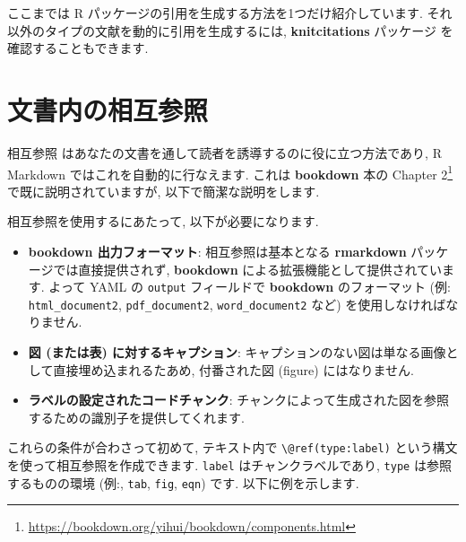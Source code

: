 \documentclass[
  11pt,
]{bxjsreport}
\renewcommand{\href}[2]{#2\footnote{\url{#1}}}
\begin{document}
ここまでは R パッケージの引用を生成する方法を1つだけ紹介しています. それ以外のタイプの文献を動的に引用を生成するには, \textbf{knitcitations} パッケージ \autocite{R-knitcitations} を確認することもできます.

\hypertarget{cross-ref}{%
\section{文書内の相互参照}\label{cross-ref}}

相互参照 はあなたの文書を通して読者を誘導するのに役に立つ方法であり, R Markdown ではこれを自動的に行なえます. これは \textbf{bookdown} 本の \href{https://bookdown.org/yihui/bookdown/components.html}{Chapter 2} で既に説明されていますが, 以下で簡潔な説明をします.

相互参照を使用するにあたって, 以下が必要になります.

\begin{itemize}
\item
  \textbf{bookdown 出力フォーマット}: 相互参照は基本となる \textbf{rmarkdown} パッケージでは直接提供されず, \textbf{bookdown} \autocite{R-bookdown} による拡張機能として提供されています. よって YAML の \texttt{output} フィールドで \textbf{bookdown} のフォーマット (例: \texttt{html\_document2}, \texttt{pdf\_document2}, \texttt{word\_document2} など) を使用しなければなりません.
\item
  \textbf{図 (または表) に対するキャプション}: キャプションのない図は単なる画像として直接埋め込まれるたあめ, 付番された図 (figure) にはなりません.
\item
  \textbf{ラベルの設定されたコードチャンク}: チャンクによって生成された図を参照するための識別子を提供してくれます.
\end{itemize}

これらの条件が合わさって初めて, テキスト内で \texttt{\textbackslash{}@ref(type:label)} という構文を使って相互参照を作成できます. \texttt{label} はチャンクラベルであり, \texttt{type} は参照するものの環境 (例:, \texttt{tab}, \texttt{fig}, \texttt{eqn}) です. 以下に例を示します.
\end{document}
